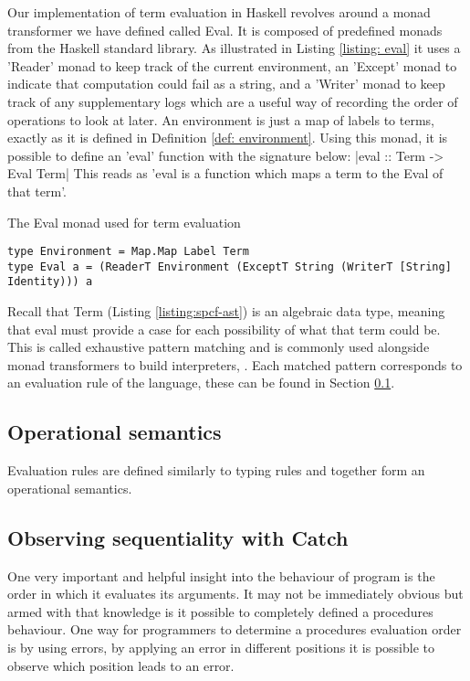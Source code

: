 \documentclass[12pt,a4paper]{report}
\theoremstyle{definition}
\theoremstyle{remark}
\begin{document}
Our implementation of term evaluation in Haskell revolves around a monad transformer we have defined called Eval. It is composed of predefined monads from the Haskell standard library. As illustrated in Listing \ref{listing: eval} it uses a 'Reader' monad to keep track of the current environment, an 'Except' monad to indicate that computation could fail as a string, and a 'Writer' monad to keep track of any supplementary logs which are a useful way of recording the order of operations to look at later. An environment is just a map of labels to terms, exactly as it is defined in Definition \ref{def: environment}. Using this monad, it is possible to define an 'eval' function with the signature below:
|eval :: Term -> Eval Term|
This reads as 'eval is a function which maps a term to the Eval of that term'. 

\begin{listing}[!ht]
\caption{The Eval monad used for term evaluation}
\begin{verbatim}
type Environment = Map.Map Label Term
type Eval a = (ReaderT Environment (ExceptT String (WriterT [String] Identity))) a
\end{verbatim}
\label{listing: eval}
\end{listing}

Recall that Term (Listing \ref{listing:spcf-ast}) is an algebraic data type, meaning that eval must provide a case for each possibility of what that term could be. This is called exhaustive pattern matching and is commonly used alongside monad transformers to build interpreters, \citep[\emph{e.g.},][]{Liang1995MonadTA}. Each matched pattern corresponds to an evaluation rule of the language, these can be found in Section \ref{section: op sem}.

\subsection{Operational semantics}\label{section: op sem}
Evaluation rules are defined similarly to typing rules and together form an operational semantics.

\subsection{Observing sequentiality with Catch}
One very important and helpful insight into the behaviour of program is the order in which it evaluates its arguments. It may not be immediately obvious but armed with that knowledge is it possible to completely defined a procedures behaviour. One way for programmers to determine a procedures evaluation order is by using errors, by applying an error in different positions it is possible to observe which position leads to an error.
\end{document}
